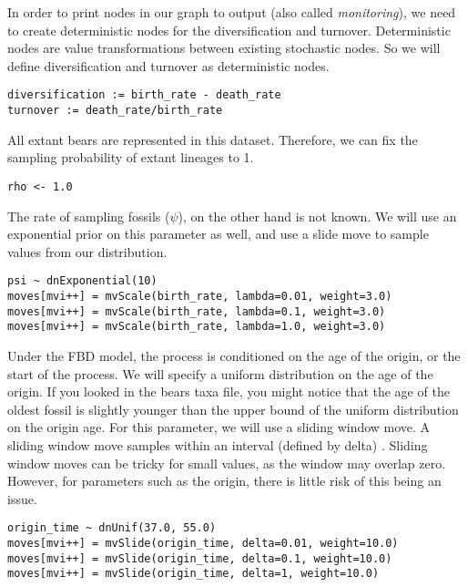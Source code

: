 In order to print nodes in our graph to output (also called \textit{monitoring}), we need to create deterministic nodes for the diversification and turnover. Deterministic nodes are value transformations between existing stochastic nodes. So we will define diversification and turnover as deterministic nodes.

{\tt \begin{snugshade*}
\begin{lstlisting}
diversification := birth_rate - death_rate
turnover := death_rate/birth_rate
\end{lstlisting}
\end{snugshade*}}

All extant bears are represented in this dataset. Therefore, we can fix the sampling probability of extant lineages to 1.

{\tt \begin{snugshade*}
\begin{lstlisting}
rho <- 1.0
\end{lstlisting}
\end{snugshade*}}

The rate of sampling fossils ($\psi$), on the other hand is not known. We will use an exponential prior on this parameter as well, and use a slide move to sample values from our distribution.

{\tt \begin{snugshade*}
\begin{lstlisting}
psi ~ dnExponential(10) 
moves[mvi++] = mvScale(birth_rate, lambda=0.01, weight=3.0)
moves[mvi++] = mvScale(birth_rate, lambda=0.1, weight=3.0)
moves[mvi++] = mvScale(birth_rate, lambda=1.0, weight=3.0)
\end{lstlisting}
\end{snugshade*}}

Under the FBD model, the process is conditioned on the age of the origin, or the start of the process. We will specify a uniform distribution on the age of the origin. If you looked in the bears taxa file, you might notice that the age of the oldest fossil is slightly younger than the upper bound of the uniform distribution on the origin age. For this parameter, we will use a sliding window move. A sliding window move samples within an interval (defined by delta) . Sliding window moves can be tricky for small values, as the window may overlap zero. However, for parameters such as the origin, there is little risk of this being an issue.

{\tt \begin{snugshade*}
\begin{lstlisting}
origin_time ~ dnUnif(37.0, 55.0)
moves[mvi++] = mvSlide(origin_time, delta=0.01, weight=10.0)
moves[mvi++] = mvSlide(origin_time, delta=0.1, weight=10.0)
moves[mvi++] = mvSlide(origin_time, delta=1, weight=10.0)
\end{lstlisting}
\end{snugshade*}}

